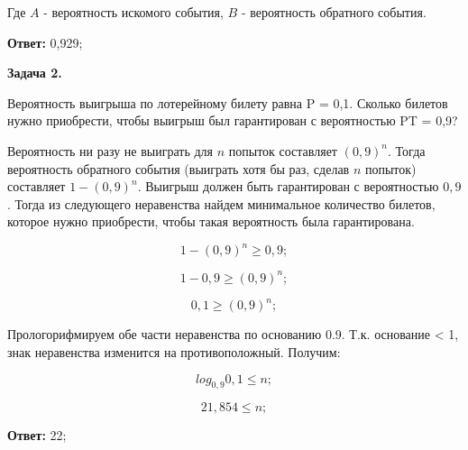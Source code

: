 \documentclass[]{article}
\begin{document}
	Где $A$ - вероятность искомого события, $B$ - вероятность обратного события.
	
	\vspace{10pt}
	
	\textbf{Ответ:} 0,929;
	
	\vspace{30pt}
	
	\centering
	\textbf{Задача 2.}
	
	\vspace{10pt}
	
	\raggedright
	\large
	
	Вероятность выигрыша по лотерейному билету равна P = 0,1. Сколько билетов нужно приобрести, чтобы выигрыш был гарантирован с вероятностью PT = 0,9?
	
	\vspace{20pt}
	
	Вероятность ни разу не выиграть для $n$ попыток составляет $(0,9)^n$. Тогда вероятность обратного события (выиграть хотя бы раз, сделав $n$ попыток) составляет $1 - (0,9)^n$. Выигрыш должен быть гарантирован с вероятностью $0,9$. Тогда из следующего неравенства найдем минимальное количество билетов, которое нужно приобрести, чтобы такая вероятность была гарантирована.
	
	\vspace{10pt}
	
	\begin{equation}
	1 - (0,9)^n \geq 0,9;
	\end{equation}
	
	\begin{equation}
	1 - 0,9 \geq (0,9)^n;
	\end{equation}
	
	\begin{equation}
	0,1 \geq (0,9)^n;
	\end{equation}
	
	\vspace{10pt}
	Прологорифмируем обе части неравенства по основанию 0.9. Т.к. основание < 1, знак неравенства изменится на противоположный. Получим:
	
	\begin{equation}
	log_{0,9}0,1 \leq n;
	\end{equation}
	
	\begin{equation}
	21,854 \leq n;
	\end{equation}
	
	\vspace{10pt}
	
	\textbf{Ответ:} 22;
	
\end{document}
